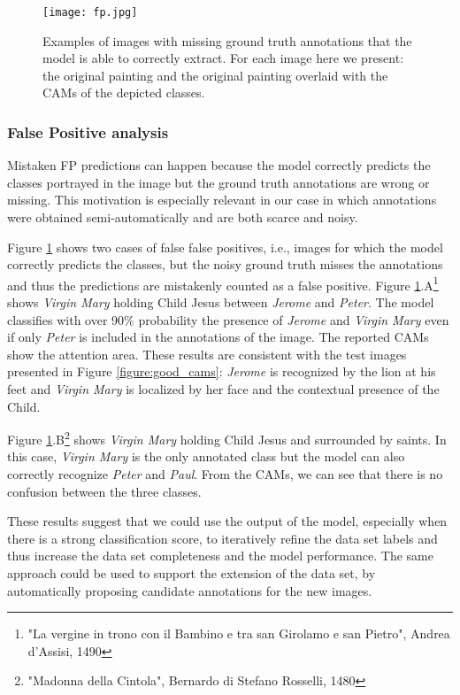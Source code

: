 \documentclass[acmlarge]{acmart}
\begin{document}
\begin{figure}[t]
    \centering
    \texttt{[image: fp.jpg]}
    \caption{Examples of images with missing ground truth annotations that the model is able to correctly extract. For each image here we present: the original painting and the original painting overlaid  with the CAMs of the depicted classes.
    }
    \label{figure:fp}
\end{figure}

\subsubsection{False Positive  analysis}

Mistaken FP predictions can happen because the model correctly predicts the classes portrayed in the image but the ground truth annotations are wrong or missing. This motivation is especially relevant in our case in which annotations were obtained semi-automatically and are both scarce and noisy. 

Figure \ref{figure:fp} shows two cases of false false positives, i.e., images for which the model correctly predicts the classes, but the noisy ground truth misses the annotations and thus the predictions are mistakenly counted as a false positive. Figure \ref{figure:fp}.A\footnote{"La vergine in trono con il Bambino e tra san Girolamo e san Pietro", Andrea d'Assisi, 1490} shows \textit{Virgin Mary} holding Child Jesus between \textit{Jerome} and \textit{Peter}. The model classifies with over 90\% probability the presence of \textit{Jerome} and \textit{Virgin Mary} even if only \textit{Peter} is included in the annotations of the image. The reported CAMs show the attention area. These results are consistent with the test images presented in Figure \ref{figure:good_cams}: \textit{Jerome} is recognized by the lion at his feet and \textit{Virgin Mary} is localized by her face and the contextual presence of the Child.

Figure \ref{figure:fp}.B\footnote{"Madonna della Cintola", Bernardo di Stefano Rosselli, 1480} shows \textit{Virgin Mary} holding Child Jesus and surrounded by  saints. In this case, \textit{Virgin Mary} is the only annotated class but the model can also correctly recognize \textit{Peter} and \textit{Paul}. From the CAMs, we can see that there is no  confusion between the three classes.

These results suggest that we could use the output of the model, especially when there is a strong classification score, to iteratively refine the data set labels and thus increase the data set completeness and the model performance. The same approach could be used to support the extension of the data set, by automatically proposing candidate annotations for  the  new images.
\end{document}
